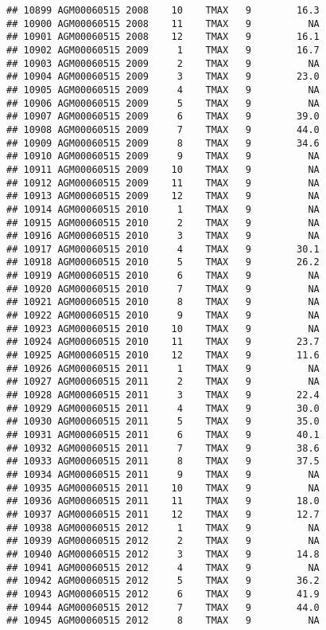 \documentclass{article}\usepackage[]{graphicx}\usepackage[]{color}
\makeatletter
\newenvironment{kframe}{%
 \def\at@end@of@kframe{}%
 \ifinner\ifhmode%
  \def\at@end@of@kframe{\end{minipage}}%
  \begin{minipage}{\columnwidth}%
 \fi\fi%
 \def\FrameCommand##1{\hskip\@totalleftmargin \hskip-\fboxsep
 \colorbox{shadecolor}{##1}\hskip-\fboxsep
     \hskip-\linewidth \hskip-\@totalleftmargin \hskip\columnwidth}%
 \MakeFramed {\advance\hsize-\width
   \@totalleftmargin\z@ \linewidth\hsize
   \@setminipage}}%
 {\par\unskip\endMakeFramed%
 \at@end@of@kframe}
\newenvironment{knitrout}{}{} %
\makeatother
\begin{document}
\begin{knitrout}
\begin{kframe}
\begin{verbatim}
## 10899 AGM00060515 2008    10    TMAX   9        16.3
## 10900 AGM00060515 2008    11    TMAX   9          NA
## 10901 AGM00060515 2008    12    TMAX   9        16.1
## 10902 AGM00060515 2009     1    TMAX   9        16.7
## 10903 AGM00060515 2009     2    TMAX   9          NA
## 10904 AGM00060515 2009     3    TMAX   9        23.0
## 10905 AGM00060515 2009     4    TMAX   9          NA
## 10906 AGM00060515 2009     5    TMAX   9          NA
## 10907 AGM00060515 2009     6    TMAX   9        39.0
## 10908 AGM00060515 2009     7    TMAX   9        44.0
## 10909 AGM00060515 2009     8    TMAX   9        34.6
## 10910 AGM00060515 2009     9    TMAX   9          NA
## 10911 AGM00060515 2009    10    TMAX   9          NA
## 10912 AGM00060515 2009    11    TMAX   9          NA
## 10913 AGM00060515 2009    12    TMAX   9          NA
## 10914 AGM00060515 2010     1    TMAX   9          NA
## 10915 AGM00060515 2010     2    TMAX   9          NA
## 10916 AGM00060515 2010     3    TMAX   9          NA
## 10917 AGM00060515 2010     4    TMAX   9        30.1
## 10918 AGM00060515 2010     5    TMAX   9        26.2
## 10919 AGM00060515 2010     6    TMAX   9          NA
## 10920 AGM00060515 2010     7    TMAX   9          NA
## 10921 AGM00060515 2010     8    TMAX   9          NA
## 10922 AGM00060515 2010     9    TMAX   9          NA
## 10923 AGM00060515 2010    10    TMAX   9          NA
## 10924 AGM00060515 2010    11    TMAX   9        23.7
## 10925 AGM00060515 2010    12    TMAX   9        11.6
## 10926 AGM00060515 2011     1    TMAX   9          NA
## 10927 AGM00060515 2011     2    TMAX   9          NA
## 10928 AGM00060515 2011     3    TMAX   9        22.4
## 10929 AGM00060515 2011     4    TMAX   9        30.0
## 10930 AGM00060515 2011     5    TMAX   9        35.0
## 10931 AGM00060515 2011     6    TMAX   9        40.1
## 10932 AGM00060515 2011     7    TMAX   9        38.6
## 10933 AGM00060515 2011     8    TMAX   9        37.5
## 10934 AGM00060515 2011     9    TMAX   9          NA
## 10935 AGM00060515 2011    10    TMAX   9          NA
## 10936 AGM00060515 2011    11    TMAX   9        18.0
## 10937 AGM00060515 2011    12    TMAX   9        12.7
## 10938 AGM00060515 2012     1    TMAX   9          NA
## 10939 AGM00060515 2012     2    TMAX   9          NA
## 10940 AGM00060515 2012     3    TMAX   9        14.8
## 10941 AGM00060515 2012     4    TMAX   9          NA
## 10942 AGM00060515 2012     5    TMAX   9        36.2
## 10943 AGM00060515 2012     6    TMAX   9        41.9
## 10944 AGM00060515 2012     7    TMAX   9        44.0
## 10945 AGM00060515 2012     8    TMAX   9          NA

\end{verbatim}
\end{kframe}
\end{knitrout}
\end{document}
